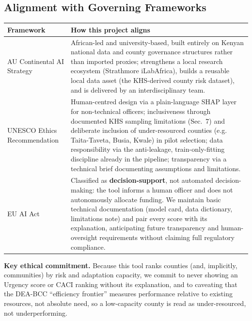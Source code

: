 \documentclass[12pt,a4paper]{article}
\begin{document}
\subsection{Alignment with Governing Frameworks}
\begin{center}
\small
\begin{tabular}{@{}p{2.9cm}p{11.6cm}@{}}
\toprule
\textbf{Framework} & \textbf{How this project aligns} \\
\midrule
AU Continental AI Strategy &
African-led and university-based, built entirely on Kenyan national data and county governance structures rather than imported proxies; strengthens a local research ecosystem (Strathmore iLabAfrica), builds a reusable local data asset (the KHS-derived county risk dataset), and is delivered by an interdisciplinary team. \\
\addlinespace
UNESCO Ethics Recommendation &
Human-centred design via a plain-language SHAP layer for non-technical officers; inclusiveness through documented KHS sampling limitations (Sec.~7) and deliberate inclusion of under-resourced counties (e.g. Taita-Taveta, Busia, Kwale) in pilot selection; data responsibility via the anti-leakage, train-only-fitting discipline already in the pipeline; transparency via a technical brief documenting assumptions and limitations. \\
\addlinespace
EU AI Act &
Classified as \textbf{decision-support}, not automated decision-making: the tool informs a human officer and does not autonomously allocate funding. We maintain basic technical documentation (model card, data dictionary, limitations note) and pair every score with its explanation, anticipating future transparency and human-oversight requirements without claiming full regulatory compliance. \\
\bottomrule
\end{tabular}
\end{center}

\textbf{Key ethical commitment.} Because this tool ranks counties (and, implicitly, communities) by risk and adaptation capacity, we commit to never showing an Urgency score or CACI ranking without its explanation, and to caveating that the DEA-BCC ``efficiency frontier'' measures performance relative to existing resources, not absolute need, so a low-capacity county is read as under-resourced, not underperforming.

\newpage
\end{document}
